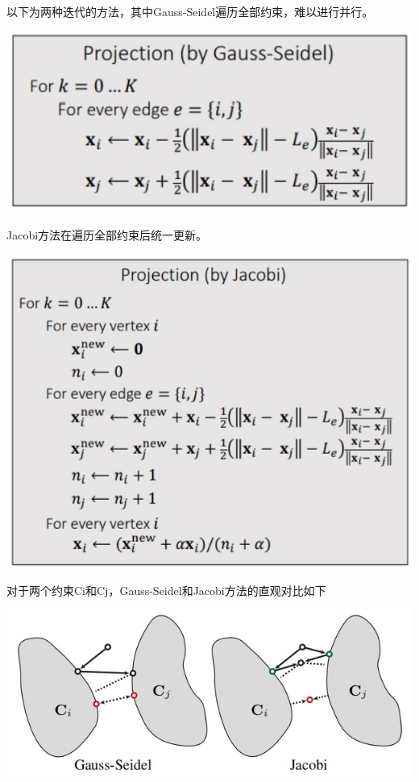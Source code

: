\documentclass{CLGPY}
\begin{document}
\begin{multicols}{2}
		以下为两种迭代的方法，其中Gauss-Seidel遍历全部约束，难以进行并行。
        \begin{center}
            \includegraphics[width=1.0\linewidth]{./fig/PBD(Gauss-Seidel).jpg}
        \end{center}

		Jacobi方法在遍历全部约束后统一更新。
        \begin{center}
            \includegraphics[width=1.0\linewidth]{./fig/PBD(Jacobi).jpg}
        \end{center}
		
		对于两个约束Ci和Cj，Gauss-Seidel和Jacobi方法的直观对比如下
        \begin{center}
            \includegraphics[width=1.0\linewidth]{./fig/Gauss-Seidel-Jacobi.jpg}
        \end{center}


\end{multicols}
\end{document}
